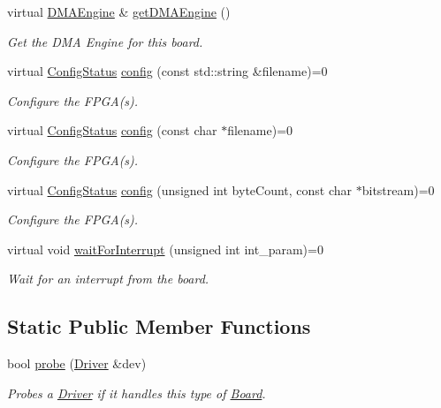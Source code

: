 \begin{CompactItemize}
virtual \hyperlink{classmprace_1_1DMAEngine}{DMAEngine} \& \hyperlink{classmprace_1_1Board_a12}{get\-DMAEngine} ()
\begin{CompactList}\small\item\em Get the DMA Engine for this board. \item\end{CompactList}\item 
virtual \hyperlink{classmprace_1_1Board_w4}{Config\-Status} \hyperlink{classmprace_1_1Board_a13}{config} (const std::string \&filename)=0
\begin{CompactList}\small\item\em Configure the FPGA(s). \item\end{CompactList}\item 
virtual \hyperlink{classmprace_1_1Board_w4}{Config\-Status} \hyperlink{classmprace_1_1Board_a14}{config} (const char $\ast$filename)=0
\begin{CompactList}\small\item\em Configure the FPGA(s). \item\end{CompactList}\item 
virtual \hyperlink{classmprace_1_1Board_w4}{Config\-Status} \hyperlink{classmprace_1_1Board_a15}{config} (unsigned int byte\-Count, const char $\ast$bitstream)=0
\begin{CompactList}\small\item\em Configure the FPGA(s). \item\end{CompactList}\item 
virtual void \hyperlink{classmprace_1_1Board_a16}{wait\-For\-Interrupt} (unsigned int int\_\-param)=0
\begin{CompactList}\small\item\em Wait for an interrupt from the board. \item\end{CompactList}\end{CompactItemize}
\subsection*{Static Public Member Functions}
\begin{CompactItemize}
\item 
bool \hyperlink{classmprace_1_1Board_e0}{probe} (\hyperlink{classmprace_1_1Driver}{Driver} \&dev)
\begin{CompactList}\small\item\em Probes a \hyperlink{classmprace_1_1Driver}{Driver} if it handles this type of \hyperlink{classmprace_1_1Board}{Board}. \item\end{CompactList}\end{CompactItemize}
